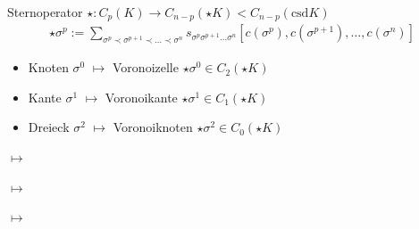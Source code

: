 \documentclass{beamer}
\newcommand{\csd}{\text{csd}}
\begin{document}
  \begin{frame}
    \begin{block}{Sternoperator \( \star: C_{p}(K) \rightarrow   C_{n-p}(\star K) < C_{n-p}(\csd K) \)}
      \begin{align*}
       \star\sigma^{p} := \sum_{\sigma^{p} \prec \sigma^{p+1} \prec \ldots \prec \sigma^{n}}
                                                   s_{\sigma^{p} \sigma^{p+1} \ldots \sigma^{n}} \left[ c(\sigma^{p}), c(\sigma^{p+1}), \ldots, c(\sigma^{n}) \right]
      \end{align*}
      \begin{itemize}
        \item<2-> Knoten \( \sigma^{0} \) \( \mapsto \) Voronoizelle \( \star\sigma^{0}\in C_{2}(\star K) \)
        \item<3-> Kante \( \sigma^{1} \) \( \mapsto \) Voronoikante \( \star\sigma^{1}\in C_{1}(\star K) \)
        \item<4-> Dreieck \( \sigma^{2} \) \( \mapsto \) Voronoiknoten \( \star\sigma^{2}\in C_{0}(\star K) \)
      \end{itemize}
    \end{block}
    \begin{overprint}
        \begin{minipage}{0.4\textwidth}
          \centering 
        \end{minipage}\hfill
       {\Huge\(\longmapsto\)}  \hfill
       \begin{minipage}{0.4\textwidth}
          \centering 
        \end{minipage}
        \begin{minipage}{0.4\textwidth}
          \centering 
        \end{minipage}\hfill
       {\Huge\(\longmapsto\)}  \hfill
       \begin{minipage}{0.4\textwidth}
          \centering 
        \end{minipage}
        \begin{minipage}{0.4\textwidth}
          \centering 
        \end{minipage}\hfill
       {\Huge\(\longmapsto\)}  \hfill
       \begin{minipage}{0.4\textwidth}
          \centering 
        \end{minipage}
    \end{overprint}
  \end{frame}
\end{document}
